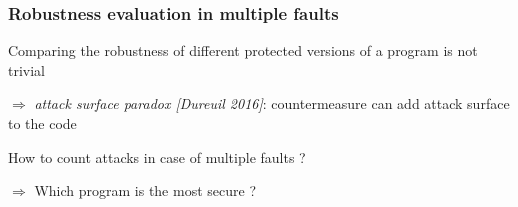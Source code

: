 \begin{frame}[fragile] \frametitle{Robustness evaluation in multiple faults} 
    \begin{small}
        \begin{itemize}
            \item Comparing the robustness of different protected versions of a program is not trivial
            \item [] $\Rightarrow$ \textit{attack surface paradox [Dureuil 2016]}: countermeasure can add attack surface to the code
            \item [] 
            \item How to count attacks in case of multiple faults ?
             {\item [] $\Rightarrow$ Which program is the most secure ?}
        \end{itemize}


\end{small}
\end{frame}
